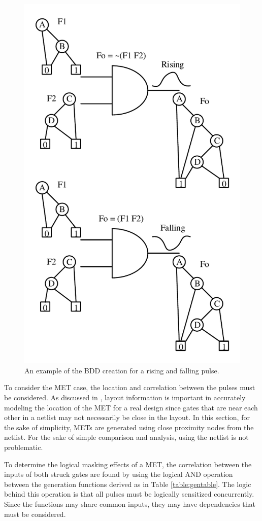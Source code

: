 \begin{figure}[!htbp]
	\centering
	\includegraphics[width=0.65\linewidth]{Figures/gen_func}
	\caption{An example of the BDD creation for a rising and falling pulse.}
	\label{BDD_GEN}
\end{figure}

To consider the MET case, the location and correlation between the pulses must be considered. As discussed in \cite{Ebrahimi2016}, layout information is important in accurately modeling the location of the MET for a real design since gates that are near each other in a netlist may not necessarily be close in the layout. In this section, for the sake of simplicity, METs are generated using close proximity nodes from the netlist. For the sake of simple comparison and analysis, using the netlist is not problematic. 

To determine the logical masking effects of a MET, the correlation between the inputs of both struck gates are found by using the logical AND operation between the generation functions derived as in Table \ref{table:gentable}. The logic behind this operation is that all pulses must be logically sensitized concurrently. Since the functions may share common inputs, they may have dependencies that must be considered. 

